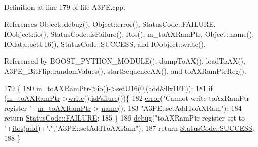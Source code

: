 Definition at line 179 of file A3\+P\+E.\+cpp.



References Object\+::debug(), Object\+::error(), Status\+Code\+::\+F\+A\+I\+L\+U\+RE, I\+Oobject\+::io(), Status\+Code\+::is\+Failure(), itos(), m\+\_\+to\+A\+X\+Ram\+Ptr, Object\+::name(), I\+Odata\+::set\+U16(), Status\+Code\+::\+S\+U\+C\+C\+E\+SS, and I\+Oobject\+::write().



Referenced by B\+O\+O\+S\+T\+\_\+\+P\+Y\+T\+H\+O\+N\+\_\+\+M\+O\+D\+U\+L\+E(), dump\+To\+A\+X(), load\+To\+A\+X(), A3\+P\+E\+\_\+\+Bit\+Flip\+::random\+Values(), start\+Sequence\+A\+X(), and to\+A\+X\+Ram\+Ptr\+Reg().


\begin{DoxyCode}
179                                      \{
180   \hyperlink{classA3PE_aae1b8b2e96bba94535bd4de766bd7e65}{m\_toAXRamPtr}->\hyperlink{classIOobject_af04fb94137c3d86849f478ac5afab5d1}{io}()->\hyperlink{classIOdata_aa9ade5ce3944c8e2b831533b6f876caf}{setU16}(0,(\hyperlink{classAttrib_a235f773af19c900264a190b00a3b4ad7}{add}&0x1FF));
181   \textcolor{keywordflow}{if} (\hyperlink{classA3PE_aae1b8b2e96bba94535bd4de766bd7e65}{m\_toAXRamPtr}->\hyperlink{classIOobject_a9f6984bc9f0fadcf800f1be2523ac744}{write}().\hyperlink{classStatusCode_a5dd22dc6eb2c52fc4cabc58f6dea2eb7}{isFailure}())\{
182     \hyperlink{classObject_a204a95f57818c0f811933917a30eff45}{error}(\textcolor{stringliteral}{"Cannot write toAxRamPtr register "}+\hyperlink{classA3PE_aae1b8b2e96bba94535bd4de766bd7e65}{m\_toAXRamPtr}->
      \hyperlink{classObject_a300f4c05dd468c7bb8b3c968868443c1}{name}(),
183         \textcolor{stringliteral}{"A3PE::setAddToAXRam"});
184     \textcolor{keywordflow}{return} \hyperlink{classStatusCode_a6f565cbeadc76d14c72f047e5e85eb4ba3da73d4c469762eb9d3c960368252b26}{StatusCode::FAILURE};
185   \}
186   \hyperlink{classObject_aac010553f022165573714b7014a15f0d}{debug}(\textcolor{stringliteral}{"toAXRamPtr register set to "}+\hyperlink{Tools_8h_af330027dbdafb9a30768b3613c553e60}{itos}(\hyperlink{classAttrib_a235f773af19c900264a190b00a3b4ad7}{add})+\textcolor{stringliteral}{"."},\textcolor{stringliteral}{"A3PE::setAddToAXRam"});
187   \textcolor{keywordflow}{return} \hyperlink{classStatusCode_a6f565cbeadc76d14c72f047e5e85eb4badd0da38d3ba0d922efd1f4619bc37ad8}{StatusCode::SUCCESS};
188 \}
\end{DoxyCode}
\mbox{\label{classA3PE_a77ccfbd9df2fad96a9a9f1dc579a7a2d}} 
